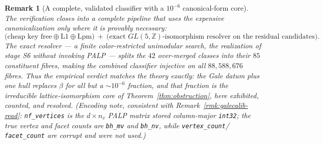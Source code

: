 \documentclass{amsart}
\newtheorem{remark}[theorem]{Remark}
\begin{document}
\begin{remark}[A complete, validated classifier with a $10^{-6}$ canonical-form
core]\label{rmk:completeclassifier}
The verification closes into a complete pipeline that uses the expensive
canonicalization only where it is provably necessary:
\[
  \text{(cheap key }\mathrm{free}\oplus\mathrm{L1}\oplus\mathrm{Lpm}\text{)}
  \ +\ \text{(exact } GL(5,\mathbb Z)\text{-isomorphism resolver on the residual
  candidates).}
\]
The exact resolver --- a finite color-restricted unimodular search, the
realization of stage S6 without invoking PALP --- splits the $42$ over-merged
classes into their $85$ constituent fibres, making the combined classifier
\emph{injective on all $88{,}588{,}676$ fibres}. Thus the empirical verdict
matches the theory exactly: the Gale datum plus one hull replaces $\beta$ for all
but a $\sim\!10^{-6}$ fraction, and that fraction is the irreducible
lattice-isomorphism core of Theorem~\ref{thm:obstruction}, here exhibited,
counted, and resolved. (Encoding note, consistent with
Remark~\ref{rmk:galecalib-read}: \texttt{nf\_vertices} is the $d\times n_v$ PALP
matrix stored column-major \texttt{int32}; the true vertex and facet counts are
\texttt{bh\_mv} and \texttt{bh\_nv}, while \texttt{vertex\_count}/%
\texttt{facet\_count} are corrupt and were not used.)
\end{remark}

\end{document}
